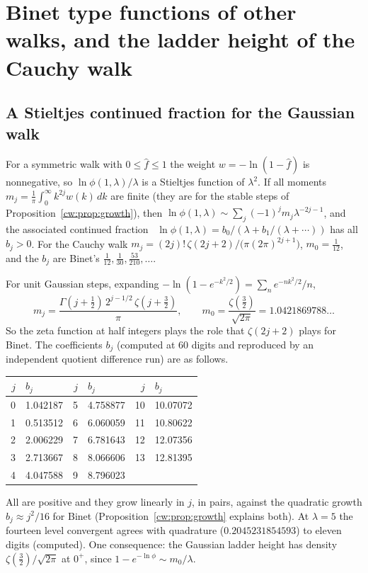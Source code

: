 \section{Binet type functions of other walks, and the ladder height of the Cauchy walk}\label{cw:sec:gaussiancf}

\subsection{A Stieltjes continued fraction for the Gaussian walk}
For a symmetric walk with $0\le\hat f\le1$ the weight $w=-\ln(1-\hat f)$ is nonnegative, so $\ln\phi(1,\lambda)/\lambda$ is a Stieltjes function of $\lambda^2$. If all moments $m_j=\frac1\pi\int_0^\infty k^{2j}w(k)\,dk$ are finite (they are for the stable steps of Proposition~\ref{cw:prop:growth}), then $\ln\phi(1,\lambda)\sim\sum_j(-1)^jm_j\lambda^{-2j-1}$, and the associated continued fraction~\cite{Stieltjes94} $\ln\phi(1,\lambda)=b_0/(\lambda+b_1/(\lambda+\cdots))$ has all $b_j>0$. For the Cauchy walk $m_j=(2j)!\,\zeta(2j+2)/\big(\pi(2\pi)^{2j+1}\big)$, $m_0=\tfrac1{12}$, and the $b_j$ are Binet's $\tfrac1{12},\tfrac1{30},\tfrac{53}{210},\dots$.

For unit Gaussian steps, expanding $-\ln(1-e^{-k^2/2})=\sum_ne^{-nk^2/2}/n$,
\[
m_j=\frac{\Gamma(j+\frac12)\,2^{j-1/2}\,\zeta(j+\frac32)}{\pi},\qquad m_0=\frac{\zeta(\frac32)}{\sqrt{2\pi}}=1.0421869788\ldots
\]
So the zeta function at half integers plays the role that $\zeta(2j+2)$ plays for Binet. The coefficients $b_j$ (computed at 60 digits and reproduced by an independent quotient difference run) are as follows.
\begin{center}
\small
\begin{tabular}{rlrlrl}
\toprule
$j$ & $b_j$ & $j$ & $b_j$ & $j$ & $b_j$\\
\midrule
0 & 1.042187 & 5 & 4.758877 & 10 & 10.07072\\
1 & 0.513512 & 6 & 6.060059 & 11 & 10.80622\\
2 & 2.006229 & 7 & 6.781643 & 12 & 12.07356\\
3 & 2.713667 & 8 & 8.066606 & 13 & 12.81395\\
4 & 4.047588 & 9 & 8.796023 & & \\
\bottomrule
\end{tabular}
\end{center}
All are positive and they grow linearly in $j$, in pairs, against the quadratic growth $b_j\approx j^2/16$ for Binet (Proposition~\ref{cw:prop:growth} explains both). At $\lambda=5$ the fourteen level convergent agrees with quadrature ($0.2045231854593$) to eleven digits (computed). One consequence: the Gaussian ladder height has density $\zeta(\tfrac32)/\sqrt{2\pi}$ at $0^+$, since $1-e^{-\ln\phi}\sim m_0/\lambda$.

